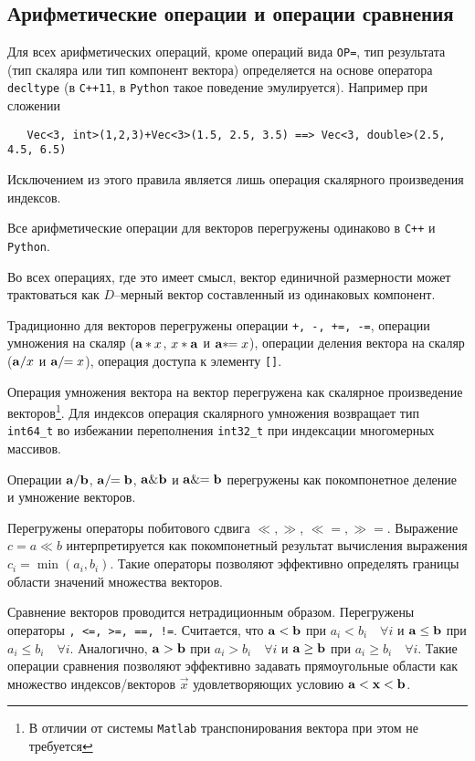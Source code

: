 \subsection{Арифметические операции и операции сравнения}
Для всех арифметических операций, кроме операций вида {\tt OP=},  тип результата (тип скаляра или тип компонент вектора) 
определяется на основе оператора {\tt decltype} (в {\tt C++11}, в {\tt Python} такое поведение эмулируется).
Например при сложении 
\begin{verbatim}
   Vec<3, int>(1,2,3)+Vec<3>(1.5, 2.5, 3.5) ==> Vec<3, double>(2.5, 4.5, 6.5)
\end{verbatim}
Исключением из этого правила является лишь операция скалярного произведения индексов.

Все арифметические операции для векторов перегружены одинаково в {\tt C++} и {\tt Python}.

Во всех операциях, где это имеет смысл, вектор единичной размерности может трактоваться как $D$--мерный вектор 
составленный из одинаковых компонент.

Традиционно для векторов перегружены операции {\tt +, -, +=, -=}, 
операции умножения на скаляр ($\mathbf{a}*x$, $x*\mathbf{a}$ и $\mathbf{a}*\!\!=x$), операции деления вектора на скаляр ($\mathbf{a}/x$ и $\mathbf{a}/\!\!=x$),
операция доступа к элементу {\tt []}. 

Операция умножения {\tt *} вектора на вектор перегружена как скалярное произведение 
векторов\footnote{В отличии от системы {\tt Matlab} транспонирования вектора при этом не требуется}.
Для индексов операция скалярного умножения возвращает тип \verb'int64_t' во избежании переполнения \verb'int32_t'
при индексации многомерных массивов.

Операции $\mathbf{a}/\mathbf{b}$, $\mathbf{a}/\!\!=\mathbf{b}$, $\mathbf{a}\&\mathbf{b}$ и $\mathbf{a}\&\!\!=\mathbf{b}$ перегружены как покомпонетное деление и умножение векторов.

Перегружены операторы
побитового сдвига $\ll, \gg$, $\ll=, \gg=$. Выражение $c=a\ll b$ интерпретируется
как покомпонетный результат вычисления выражения $c_i=\min(a_i,b_i)$. Такие операторы
позволяют эффективно определять границы области значений множества векторов. 

Сравнение векторов проводится нетрадиционным образом. Перегружены операторы
{\tt <, >, <=, >=, ==,
  !=}. Считается, что $\mathbf{a}<\mathbf{b}$ при
$a_i<b_i\quad \forall i$ и $\mathbf{a} \leq \mathbf{b}$ при
$a_i\leq b_i\quad \forall i$. Аналогично, $\mathbf{a}>\mathbf{b}$ при
$a_i>b_i\quad \forall i$ и $\mathbf{a} \geq \mathbf{b}$ при
$a_i\geq b_i\quad \forall i$. Такие операции сравнения позволяют эффективно
задавать прямоугольные области как множество индексов/векторов $\Vec x$ удовлетворяющих
условию $\mathbf{a} < \mathbf{x} < \mathbf{b}$.

